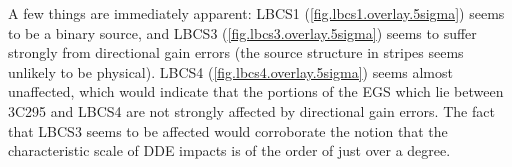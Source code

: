 %

\pg
A few things are immediately apparent: LBCS1 (\cref{fig.lbcs1.overlay.5sigma}) seems to be a binary source, and LBCS3 (\cref{fig.lbcs3.overlay.5sigma}) seems to suffer strongly from directional gain errors (the source structure in stripes seems unlikely to be physical). LBCS4 (\cref{fig.lbcs4.overlay.5sigma}) seems almost unaffected, which would indicate that the portions of the EGS which lie between 3C295 and LBCS4 are not strongly affected by directional gain errors. The fact that LBCS3 seems to be affected would corroborate the notion that the characteristic scale of DDE impacts is of the order of just over a degree.%


